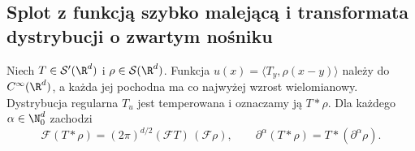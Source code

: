 \subsection{Splot z funkcją szybko malejącą i transformata dystrybucji o zwartym nośniku}

\begin{twierdzenie}
\label{thm:schwartz-convolution22}
Niech $T\in\mathcal S'(\R^d)$ i
$\rho\in\mathcal S(\R^d)$. Funkcja
$u(x)=\langle T_y,\rho(x-y)\rangle$ należy do
$C^\infty(\R^d)$, a każda jej pochodna ma
co najwyżej wzrost wielomianowy. Dystrybucja
regularna $T_u$ jest temperowana i oznaczamy ją $T*\rho$.
Dla każdego $\alpha\in\N_0^d$ zachodzi
\[
\mathcal F(T*\rho)=(2\pi)^{d/2}(\mathcal FT)\,(\mathcal F\rho),
\qquad \partial^\alpha(T*\rho)=T*(\partial^\alpha\rho).
\]
\end{twierdzenie}
